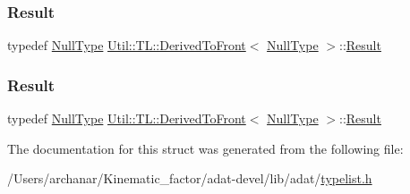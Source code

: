 \mbox{\label{structUtil_1_1TL_1_1DerivedToFront_3_01NullType_01_4_aabbce675be682669b47f114d57de74eb}} 
\subsubsection{\texorpdfstring{Result}{Result}\hspace{0.1cm}{\footnotesize\ttfamily [2/3]}}
{\footnotesize\ttfamily typedef \mbox{\hyperlink{classUtil_1_1NullType}{Null\+Type}} \mbox{\hyperlink{structUtil_1_1TL_1_1DerivedToFront}{Util\+::\+T\+L\+::\+Derived\+To\+Front}}$<$ \mbox{\hyperlink{classUtil_1_1NullType}{Null\+Type}} $>$\+::\mbox{\hyperlink{structUtil_1_1TL_1_1DerivedToFront_3_01NullType_01_4_aabbce675be682669b47f114d57de74eb}{Result}}}

\mbox{\label{structUtil_1_1TL_1_1DerivedToFront_3_01NullType_01_4_aabbce675be682669b47f114d57de74eb}} 
\subsubsection{\texorpdfstring{Result}{Result}\hspace{0.1cm}{\footnotesize\ttfamily [3/3]}}
{\footnotesize\ttfamily typedef \mbox{\hyperlink{classUtil_1_1NullType}{Null\+Type}} \mbox{\hyperlink{structUtil_1_1TL_1_1DerivedToFront}{Util\+::\+T\+L\+::\+Derived\+To\+Front}}$<$ \mbox{\hyperlink{classUtil_1_1NullType}{Null\+Type}} $>$\+::\mbox{\hyperlink{structUtil_1_1TL_1_1DerivedToFront_3_01NullType_01_4_aabbce675be682669b47f114d57de74eb}{Result}}}



The documentation for this struct was generated from the following file\+:\begin{DoxyCompactItemize}
\item 
/\+Users/archanar/\+Kinematic\+\_\+factor/adat-\/devel/lib/adat/\mbox{\hyperlink{adat-devel_2lib_2adat_2typelist_8h}{typelist.\+h}}\end{DoxyCompactItemize}
